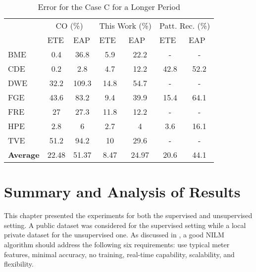 \begin{table}[tb]
\centering
\caption{Error for the Case C for a Longer Period}
\label{results2}
\begin{tabular}{lcccccc}
\hline
    & \multicolumn{2}{c}{CO (\%)}                            & \multicolumn{2}{c}{This Work (\%)}                    & \multicolumn{2}{c}{Patt. Rec. (\%)}                     \\
    & \multicolumn{1}{l}{ETE} & \multicolumn{1}{l}{EAP} & \multicolumn{1}{l}{ETE} & \multicolumn{1}{l}{EAP} & \multicolumn{1}{l}{ETE} & \multicolumn{1}{l}{EAP} \\ \hline
BME & 0.4                   & 36.8                  & 5.9                   & 22.2                  & -                    & -                    \\
CDE & 0.2                   & 2.8                   & 4.7                   & 12.2                  & 42.8                 & 52.2                   \\
DWE & 32.2                  & 109.3                   & 14.8                  & 54.7                  & -                    & -                    \\
FGE & 43.6                  & 83.2                  & 9.4                   & 39.9                  & 15.4                 & 64.1                   \\
FRE & 27                    & 27.3                  & 11.8                  & 12.2                  & -                    & -                       \\
HPE & 2.8                   & 6                   & 2.7                   & 4                   & 3.6                  & 16.1                   \\ 
TVE & 51.2                  & 94.2                  & 10                    & 29.6                  & -                    & -                    \\ \hline
\textbf{Average} & 22.48     & 51.37                  & 8.47                   & 24.97                  & 20.6                 & 44.1                 \\ \hline
\end{tabular}
\end{table}


\section{Summary and Analysis of Results}
This chapter presented the experiments for both the supervised and unsupervised setting. A public dataset was considered for the supervised setting while a local private dataset for the unsupervised one. As discussed in \cite{zeifman_analysis}, a good NILM algorithm should address the following six requirements: use typical meter features, minimal accuracy, no training, real-time capability, scalability, and flexibility.

